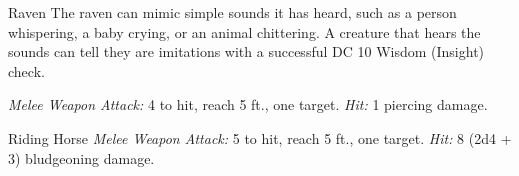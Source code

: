 \documentclass[10pt,a4paper,twoside,bg=print,twocolumn,openany,nodeprecatedcode]{dndbook}
\begin{document}
\begin{DndMonster}[float=t]{Raven}
\DndMonsterBasics[
armor-class = {12},
hit-points = {\DndDice{1d4 - 1}},
speed = {10 ft., fly 50 ft.}
]
\DndMonsterAbilityScores[
 str = 2,
 dex = 14,
 con = 8,
 int = 2,
 wis = 12,
 cha = 6
]
\DndMonsterDetails[
skills = {Perception +3},
challenge = 0,
]
The raven can mimic simple sounds it has heard, such as a person whispering, a baby crying, or an animal chittering. A creature that hears the sounds can tell they are imitations with a successful DC 10 Wisdom (Insight) check.

\textsl{Melee Weapon Attack:} 4 to hit, reach 5 ft., one target. \textsl{Hit:} 1 piercing damage.

\end{DndMonster}



\begin{DndMonster}[float=t]{Riding Horse}
\DndMonsterBasics[
armor-class = {10},
hit-points = {\DndDice{2d10 + 2}},
speed = {60 ft.}
]
\DndMonsterAbilityScores[
 str = 16,
 dex = 10,
 con = 12,
 int = 2,
 wis = 11,
 cha = 7
]
\DndMonsterDetails[
challenge = 1/4,
]
\textsl{Melee Weapon Attack:} 5 to hit, reach 5 ft., one target. \textsl{Hit:} 8 (2d4 + 3) bludgeoning damage.

\end{DndMonster}
\end{document}
